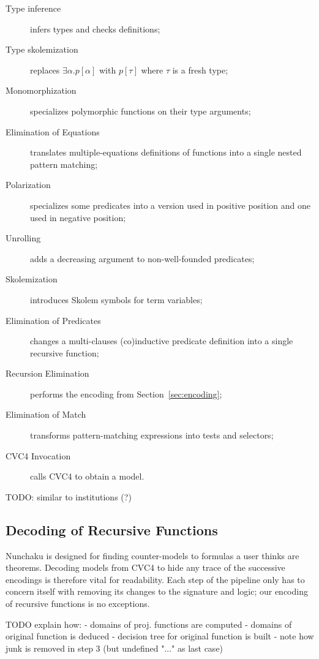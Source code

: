 \begin{description}
  \item[Type inference] infers types and checks definitions;
  \item[Type skolemization]
    replaces $\exists \alpha. p[\alpha]$
      with $p[\tau]$ where $\tau$ is a fresh type;
  \item[Monomorphization]
    specializes polymorphic functions on their type arguments;
  \item[Elimination of Equations]
    translates multiple-equations definitions of functions into
      a single nested pattern matching;
  \item[Polarization]
    specializes some predicates into a version used in positive position
      and one used in negative position;
  \item[Unrolling]
    adds a decreasing argument to non-well-founded predicates;
  \item[Skolemization]
    introduces Skolem symbols for term variables;
  \item[Elimination of Predicates]
    changes a multi-clauses (co)inductive predicate definition
      into a single recursive function;
  \item[Recursion Elimination]
    performs the encoding from Section~\ref{sec:encoding};
  \item[Elimination of Match]
    transforms pattern-matching expressions into tests and selectors;
  \item[CVC4 Invocation] calls CVC4 to obtain a model.
\end{description}

TODO: similar to institutions \cite{goguen-meseguer} (?)

\subsection{Decoding of Recursive Functions}

Nunchaku is designed for finding counter-models to formulas a user thinks
are theorems. Decoding models from CVC4 to hide any trace of the successive
encodings is therefore vital for readability. Each step
of the pipeline only has to concern itself with removing its changes to
the signature and logic; our encoding of recursive functions is no exceptions.

TODO explain how:
- domains of proj. functions are computed
- domains of original function is deduced
- decision tree for original function is built
- note how junk is removed in step 3 (but undefined "..." as last case)

